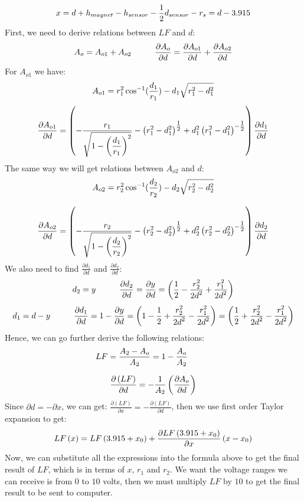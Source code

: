 \documentclass[letterpaper]{article}
\begin{document}
$$x = d + h_{magnet}-h_{sensor}-\frac{\displaystyle 1}{\displaystyle 2}d_{sensor}-r_s=d-3.915$$
First, we need to derive relations between $LF$ and $d$:
$$ A_{o} = A_{o1} + A_{o2} \hspace{1cm}  \frac{\partial A_{o}}{\partial d} = \frac{\displaystyle \partial A_{o1}}{\displaystyle \partial d}  + \frac{\displaystyle \partial A_{o2}}{\displaystyle \partial d} $$
For $A_{o1}$ we have:
$$ A_{o1} = r_{1}^2 \cos^{-1} (\frac{\displaystyle d_{1}}{\displaystyle r_{1}})-d_{1} \sqrt{r_{1}^2-d_{1}^2} $$
$$ \frac{\partial A_{o1}}{\partial d} = \left( -\frac{\displaystyle r_{1}}{\displaystyle \sqrt{1 - \left(\frac{\displaystyle d_{1}}{\displaystyle r_{1}}\right)^2}} - \left( r_{1}^2 - d_{1}^2\right)^{\tfrac{1}{2}} + d_{1}^2 \left( r_{1}^2 - d_{1}^2\right)^{-\tfrac{1}{2}} \right) \frac{\partial d_{1}}{\partial d}$$
The same way we will get relations between $A_{o2}$ and $d$:
$$ A_{o2} = r_{2}^2 \cos^{-1} (\frac{\displaystyle d_{2}}{\displaystyle r_{2}})-d_{2} \sqrt{r_{2}^2-d_{2}^2}$$ 

$$ \frac{\displaystyle \partial A_{o2}}{\displaystyle \partial d} = \left( -\frac{\displaystyle r_{2}}{\displaystyle \sqrt{1 - \left(\frac{\displaystyle d_{2}}{\displaystyle r_{2}}\right)^2}} - \left( r_{2}^2 - d_{2}^2\right)^{\tfrac{1}{2}} + d_{2}^2 \left( r_{2}^2 - d_{2}^2\right)^{-\tfrac{1}{2}} \right) \frac{\displaystyle \partial d_{2}}{\displaystyle \partial d}$$
We also need to find $\tfrac{\partial d_1}{\partial d}$ and $\tfrac{\partial d_2}{\partial d}$:
$$ d_{2}=y \hspace{1cm} \frac{\displaystyle \partial d_2}{\displaystyle \partial d} =  \frac{\partial y}{\partial d} = \left(\frac{\displaystyle 1}{\displaystyle 2}  -\frac{\displaystyle r_{2}^2}{\displaystyle 2d^2} + \frac{\displaystyle r_{1}^2}{\displaystyle 2d^2}\right) $$
$$  d_{1}=d-y \hspace{1cm}   \frac{\displaystyle \partial d_1}{\displaystyle \partial d} = 1 - \frac{\displaystyle \partial y}{\displaystyle \partial d} = \left(1 - \frac{\displaystyle 1}{\displaystyle 2}  +\frac{\displaystyle r_{2}^2}{\displaystyle 2d^2} - \frac{\displaystyle r_{1}^2}{\displaystyle 2d^2}\right) = \left(\frac{\displaystyle 1}{\displaystyle 2}  +\frac{\displaystyle r_{2}^2}{\displaystyle 2d^2} - \frac{\displaystyle r_{1}^2}{\displaystyle 2d^2}\right)$$
Hence, we can go further derive the following relations:
$$ LF = \frac{\displaystyle A_{2} - A_{o}}{\displaystyle A_{2}} = 1 - \frac{\displaystyle A_{o}}{\displaystyle A_{2}} \hspace{1cm} $$

$$ \frac{\displaystyle \partial \left(LF\right)}{\displaystyle \partial d} = - \frac{\displaystyle 1}{\displaystyle A_{2}} \left( \frac{\displaystyle \partial A_{o}}{\displaystyle \partial d} \right) $$
Since $\partial d = - \partial x$, we can get:
$\tfrac{\partial \left(LF\right)}{\partial x} = -\tfrac{\partial \left(LF\right)}{\partial d}$, then we use first order Taylor expansion to get:
$$LF\left(x\right) = LF\left(3.915 + x_0\right) + \frac{\displaystyle \partial LF\left(3.915 + x_0\right)}{\displaystyle \partial x} \left(x-x_0\right)$$
Now, we can substitute all the expressions into the formula above to get the final result of $LF$, which is in terms of $x$, $r_1$ and $r_2$. We want the voltage ranges we can receive is from $0$ to $10$ volts, then we must multiply $LF$ by $10$ to get the final result to be sent to computer.\\
\end{document}
